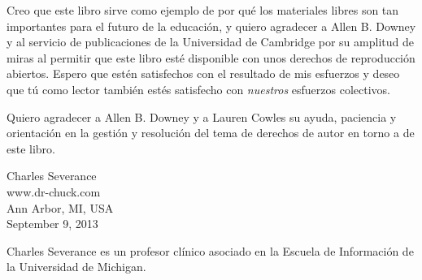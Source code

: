 Creo que este libro sirve como ejemplo de por qué los materiales libres
son tan importantes para el futuro de la educación,
y quiero agradecer a Allen B. Downey y al servicio de publicaciones de
la Universidad de Cambridge por su amplitud de miras al permitir
que este libro esté disponible con unos derechos de reproducción abiertos.
Espero que estén satisfechos con el resultado de mis esfuerzos y deseo
que tú como lector también estés satisfecho con \emph{nuestros}
esfuerzos colectivos.

Quiero agradecer a Allen B. Downey y a Lauren Cowles su ayuda,
paciencia y orientación en la gestión y resolución del tema
de derechos de autor en torno a de este libro.

Charles Severance\\
www.dr-chuck.com\\
Ann Arbor, MI, USA\\
September 9, 2013

Charles Severance es un
profesor clínico asociado
en la Escuela de Información de la Universidad de Michigan.

\clearemptydoublepage

\begin{latexonly}

\tableofcontents

\clearemptydoublepage

\end{latexonly}

\mainmatter


